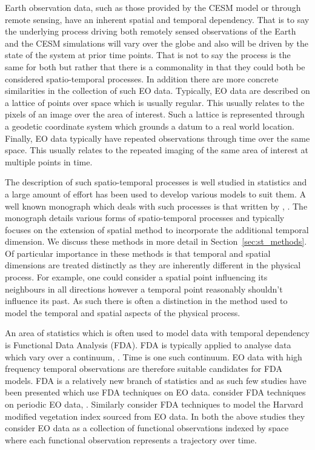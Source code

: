 Earth observation data, such as those provided by the CESM model or through remote sensing, have an inherent spatial and temporal dependency.
That is to say the underlying process driving both remotely sensed observations of the Earth and the CESM simulations will vary over the globe and also will be driven by the state of the system at prior time points.
That is not to say the process is the same for both but rather that there is a commonality in that they could both be considered spatio-temporal processes.
In addition there are more concrete similarities in the collection of such EO data.
Typically, EO data are described on a lattice of points over space which is usually regular.
This usually relates to the pixels of an image over the area of interest.
Such a lattice is represented through a geodetic coordinate system which grounds a datum to a real world location.
Finally, EO data typically have repeated observations through time over the same space.
This usually relates to the repeated imaging of the same area of interest at multiple points in time.

The description of such spatio-temporal processes is well studied in statistics and a large amount of effort has been used to develop various models to suit them.
A well known monograph which deals with such processes is that written by \citeauthor{cressie_statistics_2011}, \cite{cressie_statistics_2011}.
The monograph details various forms of spatio-temporal processes and typically focuses on the extension of spatial method to incorporate the additional temporal dimension.
We discuss these methods in more detail in Section~\ref{sec:st_methods}.
Of particular importance in these methods is that temporal and spatial dimensions are treated distinctly as they are inherently different in the physical process.
For example, one could consider a spatial point influencing its neighbours in all directions however a temporal point reasonably shouldn't influence its past.
As such there is often a distinction in the method used to model the temporal and spatial aspects of the physical process.

An area of statistics which is often used to model data with temporal dependency is Functional Data Analysis (FDA).
FDA is typically applied to analyse data which vary over a continuum, \citep{ramsay_functional_2010}.
Time is one such continuum.
EO data with high frequency temporal observations are therefore suitable candidates for FDA models.
FDA is a relatively new branch of statistics and as such few studies have been presented which use FDA techniques on EO data.
\citeauthor{liu_functional_2012} consider FDA techniques on periodic EO data, \citep{liu_functional_2012}. 
Similarly \citeauthor{hooker_maximal_2015} consider FDA techniques to model the Harvard modified vegetation index sourced from EO data.
In both the above studies they consider EO data as a collection of functional observations indexed by space where each functional observation represents a trajectory over time.

